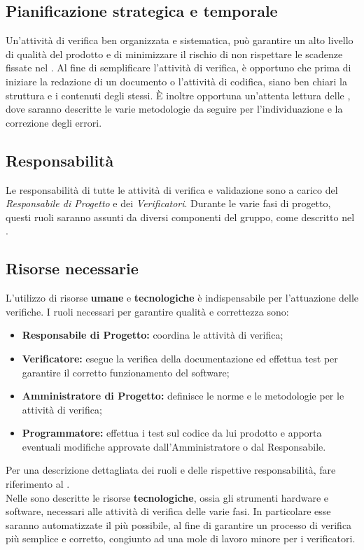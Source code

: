 \subsection{Pianificazione strategica e temporale}
\label{pianificazione_strategica}
Un'attività di verifica ben organizzata e sistematica, può garantire un alto livello di qualità del prodotto e di minimizzare il rischio di non rispettare le scadenze fissate nel \PdP. Al fine di semplificare l'attività di verifica, è opportuno che prima di iniziare la redazione di un documento o l'attività di codifica, siano ben chiari la struttura e i contenuti degli stessi. È inoltre opportuna un'attenta lettura delle \NdP{}, dove saranno descritte le varie metodologie da seguire per l'individuazione e la correzione degli errori.

\subsection{Responsabilità}
\label{responsabilità}
Le responsabilità di tutte le attività di verifica e validazione sono a carico del \textit{Responsabile di Progetto} e dei \textit{Verificatori}. Durante le varie fasi di progetto, questi ruoli saranno assunti da diversi componenti del gruppo, come descritto nel \PdP.

\subsection{Risorse necessarie}
\label{risorse_necessarie}
L'utilizzo di risorse \textbf{umane} e \textbf{tecnologiche} è indispensabile per l'attuazione delle verifiche.
I ruoli necessari per garantire qualità e correttezza sono:
\begin{itemize}
	\item \textbf{Responsabile di Progetto:} coordina le attività di verifica;
	\item \textbf{Verificatore:} esegue la verifica della documentazione ed effettua test per garantire il corretto funzionamento del software;
	\item \textbf{Amministratore di Progetto:} definisce le norme e le metodologie per le attività di verifica;
	\item \textbf{Programmatore:} effettua i test sul codice da lui prodotto e apporta eventuali modifiche approvate dall'Amministratore o dal Responsabile.
\end{itemize}
Per una descrizione dettagliata dei ruoli e delle rispettive responsabilità, fare riferimento al \PdP.
\\Nelle \NdP{} sono descritte le risorse \textbf{tecnologiche}, ossia gli strumenti hardware e software, necessari alle attività di verifica delle varie fasi. In particolare esse saranno automatizzate il più possibile, al fine di garantire un processo di verifica più semplice e corretto, congiunto ad una mole di lavoro minore per i verificatori.

